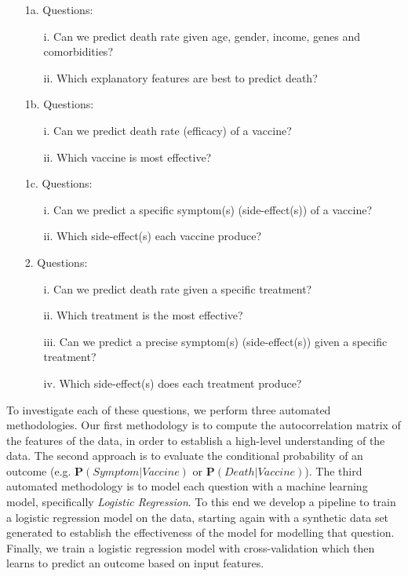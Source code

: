 \label{Tasks and Questions}
\begin{itemize}
    \item[1a.] Questions:
    \begin{itemize}
        \item[i.] Can we predict death rate given age, gender, income, genes and comorbidities?
        \item[ii.] Which explanatory features are best to predict death?
    \label{task1}
    \end{itemize}
    
    \item[1b.] Questions:
    \begin{itemize}
        \item[i.] Can we predict death rate (efficacy) of a vaccine?
        \item[ii.] Which vaccine is most effective?
    \end{itemize}
    
    \item[1c.] Questions:
    \begin{itemize}
        \item[i.] Can we predict a specific symptom(s) (side-effect(s)) of a vaccine?
        \item[ii.] Which side-effect(s) each vaccine produce?
    \end{itemize}
    
    \item[2.] Questions:
    \begin{itemize}
        \item[i.] Can we predict death rate given a specific treatment?
        \item[ii.] Which treatment is the most effective?
        \item[iii.] Can we predict a precise symptom(s) (side-effect(s)) given a specific treatment?
        \item[iv.] Which side-effect(s) does each treatment produce?
    \label{task2}
    \end{itemize}
\end{itemize}

To investigate each of these questions, we perform three automated methodologies. Our first methodology is to compute the autocorrelation matrix of the features of the data, in order to establish a high-level understanding of the data. The second approach is to evaluate the conditional probability of an outcome (e.g. $\mathbf{P}(Symptom | Vaccine)$ or $\mathbf{P}(Death | Vaccine)$). The third automated methodology is to model each question with a machine learning model, specifically \emph{Logistic Regression}. To this end we develop a pipeline to train a logistic regression model on the data, starting again with a synthetic data set generated to establish the effectiveness of the model for modelling that question. Finally, we train a logistic regression model with cross-validation which then learns to predict an outcome based on input features.

